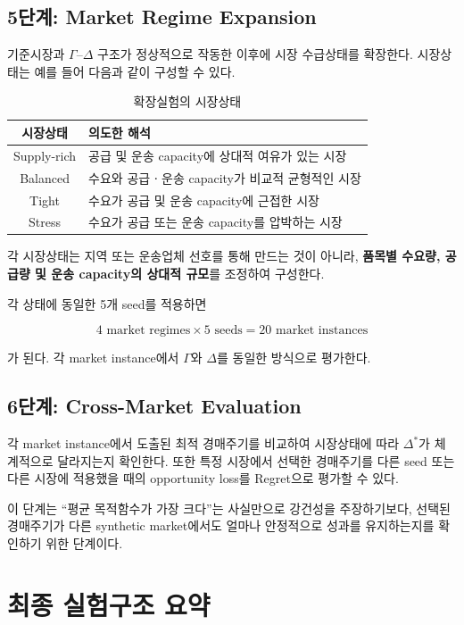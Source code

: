 \documentclass[11pt,a4paper]{article}
\begin{document}
\subsection{5단계: Market Regime Expansion}

기준시장과 $\Gamma$--$\Delta$ 구조가 정상적으로 작동한 이후에
시장 수급상태를 확장한다.
시장상태는 예를 들어 다음과 같이 구성할 수 있다.

\begin{table}[h!]
\centering
\caption{확장실험의 시장상태}
\begin{tabular}{cl}
\toprule
\textbf{시장상태} & \textbf{의도한 해석} \\
\midrule
Supply-rich & 공급 및 운송 capacity에 상대적 여유가 있는 시장 \\
Balanced & 수요와 공급ㆍ운송 capacity가 비교적 균형적인 시장 \\
Tight & 수요가 공급 및 운송 capacity에 근접한 시장 \\
Stress & 수요가 공급 또는 운송 capacity를 압박하는 시장 \\
\bottomrule
\end{tabular}
\end{table}

각 시장상태는 지역 또는 운송업체 선호를 통해 만드는 것이 아니라,
\textbf{품목별 수요량, 공급량 및 운송 capacity의 상대적 규모}를 조정하여 구성한다.

각 상태에 동일한 5개 seed를 적용하면

\[
4\text{ market regimes}\times5\text{ seeds}
=
20\text{ market instances}
\]

가 된다.
각 market instance에서 $\Gamma$와 $\Delta$를 동일한 방식으로 평가한다.

\subsection{6단계: Cross-Market Evaluation}

각 market instance에서 도출된 최적 경매주기를 비교하여
시장상태에 따라 $\Delta^*$가 체계적으로 달라지는지 확인한다.
또한 특정 시장에서 선택한 경매주기를 다른 seed 또는 다른 시장에 적용했을 때의
opportunity loss를 Regret으로 평가할 수 있다.

이 단계는 ``평균 목적함수가 가장 크다''는 사실만으로 강건성을 주장하기보다,
선택된 경매주기가 다른 synthetic market에서도 얼마나 안정적으로 성과를 유지하는지를 확인하기 위한 단계이다.

\section{최종 실험구조 요약}
\end{document}
